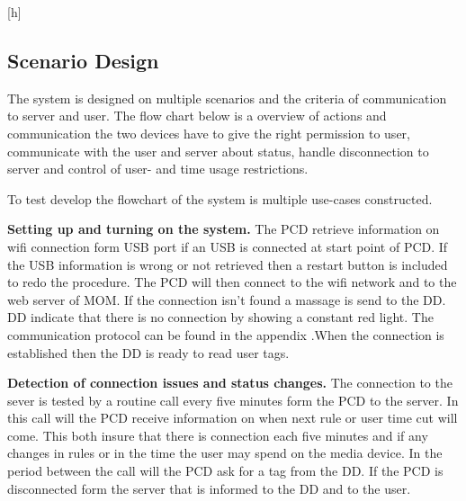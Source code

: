 \begin{center}[h]
\subsection{Scenario Design}

The system is designed on multiple scenarios and the criteria of communication to server and user. The flow chart below is a overview of actions and communication the two devices have to give the right permission to user, communicate with the user and server about status, handle disconnection to server and control of user- and time usage restrictions.\newline


To test develop the flowchart of the system is multiple use-cases constructed.\newline


\textbf{Setting up and turning on the system.} \newline
The PCD retrieve information on wifi connection form USB port if an USB is connected at start point of PCD. 
If the USB information is wrong or not retrieved then a restart button is included to redo the procedure.  \newline
The PCD will then connect to the wifi network and to the web server of MOM. If the connection isn't found a massage is send to the DD. \newline DD indicate that there is no connection by showing a constant red light. The communication protocol can be found in the appendix  .\newline When the connection is established then the DD is ready to read user tags.\newline

\textbf{Detection of connection issues and status changes.} \newline
The connection to the sever is tested by a routine call every five minutes form the PCD to the server. In this call will the PCD receive information on when next rule or user time cut will come. This both insure that there is connection each five minutes and if any changes in rules or in the time the user may spend on the media device. In the period between the call will the PCD ask for a tag from the DD. If the PCD is disconnected form the server that is informed to the DD and to the user.  \newline
	

\end{center}
